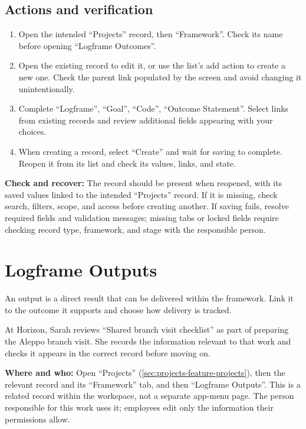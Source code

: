 \subsection{Actions and verification}
\begin{enumerate}
\item Open the intended “Projects” record, then “Framework”. Check its name before opening “Logframe Outcomes”.
\item Open the existing record to edit it, or use the list's add action to create a new one. Check the parent link populated by the screen and avoid changing it unintentionally.
\item Complete “Logframe”, “Goal”, “Code”, “Outcome Statement”. Select links from existing records and review additional fields appearing with your choices.
\item When creating a record, select “Create” and wait for saving to complete. Reopen it from its list and check its values, links, and state.
\end{enumerate}

\textbf{Check and recover:} The record should be present when reopened, with its saved values linked to the intended “Projects” record. If it is missing, check search, filters, scope, and access before creating another. If saving fails, resolve required fields and validation messages; missing tabs or locked fields require checking record type, framework, and stage with the responsible person.

\clearpage
\section{Logframe Outputs}
\label{sec:projects-feature-logframe-outputs}

An output is a direct result that can be delivered within the framework. Link it to the outcome it supports and choose how delivery is tracked.

\begin{rcnote}
At Horizon, Sarah reviews “Shared branch visit checklist” as part of preparing the Aleppo branch visit. She records the information relevant to that work and checks it appears in the correct record before moving on.
\end{rcnote}

\textbf{Where and who:} Open “Projects” (\ref{sec:projects-feature-projects}), then the relevant record and its “Framework” tab, and then “Logframe Outputs”. This is a related record within the workspace, not a separate app-menu page. The person responsible for this work uses it; employees edit only the information their permissions allow.

